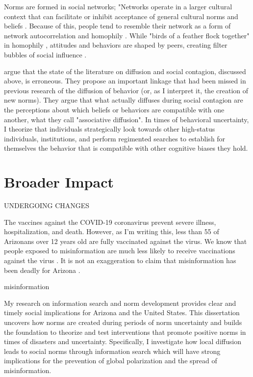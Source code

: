 Norms are formed in social networks; "Networks operate in a larger
cultural context that can facilitate or inhibit acceptance of general
cultural norms and beliefs \citep{pescosolidoDurkheimSuicideReligion1989, whiteSocialStructureMultiple1976}. Because of this, people tend to resemble
their network as a form of network autocorrelation and homophily
\citep{dellapostaWhyLiberalsDrink2015}. While "birds of a feather flock
together" in homophily \citep{mcphersonBirdsFeatherHomophily2001},
attitudes and behaviors are shaped by peers, creating filter bubbles of
social influence \citep{dellapostaWhyLiberalsDrink2015}.

\citet{goldbergSocialContagionAssociative2018} argue that the state of the literature on
diffusion and social contagion, discussed above, is erroneous. They
propose an important linkage that had been missed in previous research
of the diffusion of behavior (or, as I interpret it, the creation of new
norms). They argue that what actually diffuses during social contagion
are the perceptions about which beliefs or behaviors are compatible with
one another, what they call "associative diffusion". In times of
behavioral uncertainty, I theorize that individuals strategically look
towards other high-status individuals, institutions, and perform
regimented searches to establish for themselves the behavior that is
compatible with other cognitive biases they hold.

\section{Broader Impact}
UNDERGOING CHANGES


The vaccines against the COVID-19 coronavirus prevent severe illness,
hospitalization, and death. However, as I'm writing this, less than 55%
of Arizonans over 12 years old are fully vaccinated against the virus.
We know that people exposed to misinformation are much less likely to
receive vaccinations against the virus \citep{loombaMeasuringImpactCOVID192021}. It is not
an exaggeration to claim that misinformation has been deadly for Arizona
\citep{pathakInfodemicsCOVID19Role2020}.

misinformation \citep{greene_murphy21}

My research on information search and norm development provides clear
and timely social implications for Arizona and the United States. This
dissertation uncovers how norms are created during periods of norm
uncertainty and builds the foundation to theorize and test interventions
that promote positive norms in times of disasters and uncertainty.
Specifically, I investigate how local diffusion leads to social norms
through information search which will have strong implications for the
prevention of global polarization and the spread of misinformation.

